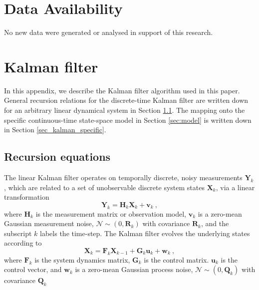 \documentclass[fleqn,usenatbib,useAMS]{mnras}
\begin{document}
\section*{Data Availability}
No new data were generated or analysed in support of this research.





	


\appendix

\section{Kalman filter} \label{sec:kalman}
In this appendix, we describe the Kalman filter algorithm used in this paper. General recursion relations for the discrete-time Kalman filter are written down for an arbitrary linear dynamical system in Section \ref{sec_kalman_general}. The mapping onto the specific continuous-time state-space model in Section \ref{sec:model} is written down in Section \ref{sec_kalman_specific}.


\subsection{Recursion equations}\label{sec_kalman_general}
The linear Kalman filter operates on temporally discrete, noisy measurements $\boldsymbol{Y}_k$, which are related to a set of unobservable discrete system states $\boldsymbol{X}_k$, via a linear transformation
\begin{equation}
	\boldsymbol{Y}_k = \boldsymbol{H}_k \boldsymbol{X}_k + \boldsymbol{v}_k \ ,\label{eq:kalman1}
\end{equation}
where $\boldsymbol{H}_k$ is the measurement matrix or observation model, $\boldsymbol{v}_k$ is a zero-mean Gaussian measurement noise, $\mathcal{N} \sim (0,\boldsymbol{R}_k)$ with covariance $\boldsymbol{R}_k$, and the subscript $k$ labels the time-step. The Kalman filter evolves the underlying states according to
\begin{equation}
	\boldsymbol{X}_k = \boldsymbol{F}_k \boldsymbol{X}_{k-1} + \boldsymbol{G}_k \boldsymbol{u}_k + \boldsymbol{w}_k \ , \label{eq:kalman2}
\end{equation}
where $\boldsymbol{F}_k$ is the system dynamics matrix, $\boldsymbol{G}_k$ is the control matrix. $\boldsymbol{u}_k$ is the control vector, and $\boldsymbol{w}_k$ is a zero-mean Gaussian process noise, $\mathcal{N} \sim (0,\boldsymbol{Q}_k)$ with covariance $\boldsymbol{Q}_k$ \newline 
\end{document}

